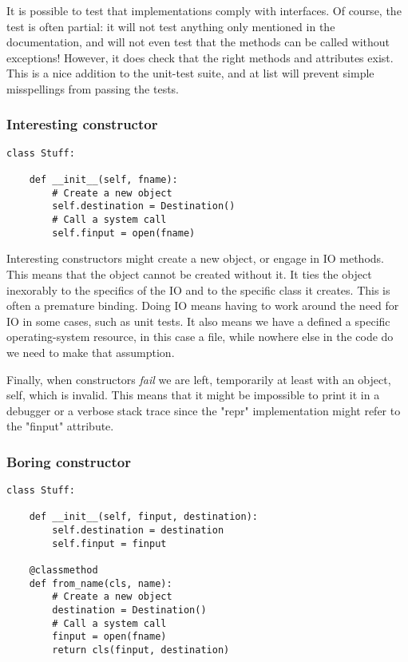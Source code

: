 \documentclass[ignorenonframetext,aspectration=169]{beamer}
\begin{document}
It is possible to test that implementations comply with interfaces.
Of course,
the test is often partial:
it will not test anything only mentioned in the documentation,
and will not even test that the methods can be called without exceptions!
However,
it does check that the right methods and attributes exist.
This is a nice addition to the unit-test suite,
and at list will prevent simple misspellings from passing the tests.

\begin{frame}[fragile]
\frametitle{Interesting constructor}

\begin{lstlisting}
class Stuff:

    def __init__(self, fname):
        # Create a new object
        self.destination = Destination()
        # Call a system call
        self.finput = open(fname)
\end{lstlisting}

\end{frame}

Interesting constructors might create a new object,
or engage in IO methods.
This means that the object cannot be created without it.
It ties the object inexorably to the specifics of the IO
and to the specific class it creates.
This is often a premature binding.
Doing IO means having to work around the need for IO
in some cases,
such as unit tests.
It also means we have a defined a specific operating-system resource,
in this case a file,
while nowhere else in the code do we need to make that assumption.

Finally,
when constructors
{\em fail}
we are left,
temporarily at least with an object,
self,
which is invalid.
This means that it might be impossible to print it in a debugger
or a verbose stack trace since the "repr" implementation
might refer to the "finput" attribute.


\begin{frame}[fragile]
\frametitle{Boring constructor}

\begin{lstlisting}
class Stuff:

    def __init__(self, finput, destination):
        self.destination = destination
        self.finput = finput

    @classmethod
    def from_name(cls, name):
        # Create a new object
        destination = Destination()
        # Call a system call
        finput = open(fname)
        return cls(finput, destination)
\end{lstlisting}

\end{frame}
\end{document}
